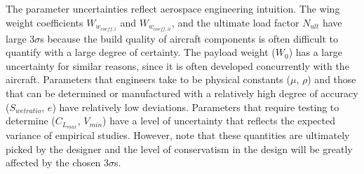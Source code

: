 The parameter uncertainties reflect aerospace engineering intuition.
The wing weight coefficients $W_{w_{coeff,i}}$ and $W_{w_{coeff,ii}}$, and the ultimate load factor $N_{ult}$ have
large $3\sigma$s because the build quality of aircraft components is
often difficult to quantify with a large degree of certainty.
The payload weight ($W_0$) has a large uncertainty for similar reasons,
since it is often developed concurrently with the aircraft.
Parameters that engineers take to be
physical constants ($\mu$, $\rho$) and those that can be determined or manufactured with a relatively
high degree of accuracy ($S_{wetratio}$, $e$) have relatively low deviations.
Parameters that require testing to determine ($C_{L_{max}}$, $V_{min}$) have a level of uncertainty
that reflects the expected variance of empirical studies. However, note that
these quantities are ultimately picked by the designer and the level of conservatism in the
design will be greatly affected by the chosen $3\sigma$s.
